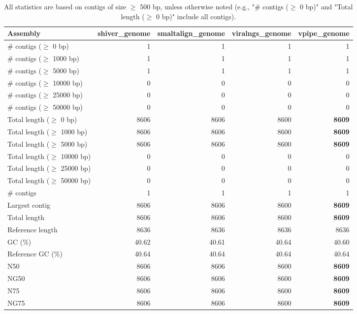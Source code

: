 \documentclass[12pt,a4paper]{article}
\begin{document}
\begin{table}[ht]
\begin{center}
\caption{All statistics are based on contigs of size $\geq$ 500 bp, unless otherwise noted (e.g., "\# contigs ($\geq$ 0 bp)" and "Total length ($\geq$ 0 bp)" include all contigs).}
\begin{tabular}{|l*{4}{|r}|}
\hline
Assembly & shiver\_genome & smaltalign\_genome & viralngs\_genome & vpipe\_genome \\ \hline
\# contigs ($\geq$ 0 bp) & 1 & 1 & 1 & 1 \\ \hline
\# contigs ($\geq$ 1000 bp) & 1 & 1 & 1 & 1 \\ \hline
\# contigs ($\geq$ 5000 bp) & 1 & 1 & 1 & 1 \\ \hline
\# contigs ($\geq$ 10000 bp) & 0 & 0 & 0 & 0 \\ \hline
\# contigs ($\geq$ 25000 bp) & 0 & 0 & 0 & 0 \\ \hline
\# contigs ($\geq$ 50000 bp) & 0 & 0 & 0 & 0 \\ \hline
Total length ($\geq$ 0 bp) & 8606 & 8606 & 8600 & {\bf 8609} \\ \hline
Total length ($\geq$ 1000 bp) & 8606 & 8606 & 8600 & {\bf 8609} \\ \hline
Total length ($\geq$ 5000 bp) & 8606 & 8606 & 8600 & {\bf 8609} \\ \hline
Total length ($\geq$ 10000 bp) & 0 & 0 & 0 & 0 \\ \hline
Total length ($\geq$ 25000 bp) & 0 & 0 & 0 & 0 \\ \hline
Total length ($\geq$ 50000 bp) & 0 & 0 & 0 & 0 \\ \hline
\# contigs & 1 & 1 & 1 & 1 \\ \hline
Largest contig & 8606 & 8606 & 8600 & {\bf 8609} \\ \hline
Total length & 8606 & 8606 & 8600 & {\bf 8609} \\ \hline
Reference length & 8636 & 8636 & 8636 & 8636 \\ \hline
GC (\%) & 40.62 & 40.61 & 40.64 & 40.60 \\ \hline
Reference GC (\%) & 40.64 & 40.64 & 40.64 & 40.64 \\ \hline
N50 & 8606 & 8606 & 8600 & {\bf 8609} \\ \hline
NG50 & 8606 & 8606 & 8600 & {\bf 8609} \\ \hline
N75 & 8606 & 8606 & 8600 & {\bf 8609} \\ \hline
NG75 & 8606 & 8606 & 8600 & {\bf 8609} \\ \hline

\end{tabular}
\end{center}
\end{table}
\end{document}

